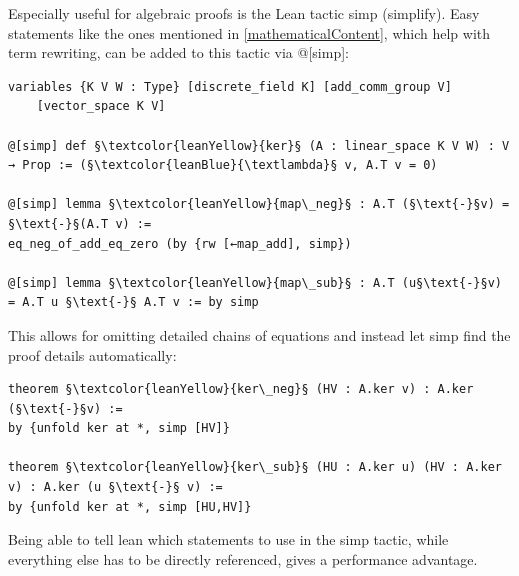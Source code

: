 \documentclass[11pt]{article}
\begin{document}
Especially useful for algebraic proofs is the Lean tactic {\lean simp} (simplify). Easy statements like the ones mentioned in \ref{mathematicalContent}, which help with term rewriting, can be added to this tactic via {\lean @[simp]}:
\begin{lstlisting}
variables {K V W : Type} [discrete_field K] [add_comm_group V]
	[vector_space K V]

@[simp] def §\textcolor{leanYellow}{ker}§ (A : linear_space K V W) : V → Prop := (§\textcolor{leanBlue}{\textlambda}§ v, A.T v = 0)

@[simp] lemma §\textcolor{leanYellow}{map\_neg}§ : A.T (§\text{-}§v) = §\text{-}§(A.T v) :=
eq_neg_of_add_eq_zero (by {rw [←map_add], simp})

@[simp] lemma §\textcolor{leanYellow}{map\_sub}§ : A.T (u§\text{-}§v) = A.T u §\text{-}§ A.T v := by simp
\end{lstlisting}
This allows for omitting detailed chains of equations and instead let {\lean simp} find the proof details automatically:
\begin{lstlisting}
theorem §\textcolor{leanYellow}{ker\_neg}§ (HV : A.ker v) : A.ker (§\text{-}§v) :=
by {unfold ker at *, simp [HV]}

theorem §\textcolor{leanYellow}{ker\_sub}§ (HU : A.ker u) (HV : A.ker v) : A.ker (u §\text{-}§ v) :=
by {unfold ker at *, simp [HU,HV]}
\end{lstlisting}
Being able to tell lean which statements to use in the {\lean simp} tactic, while everything else has to be directly referenced, gives a performance advantage.
\end{document}
